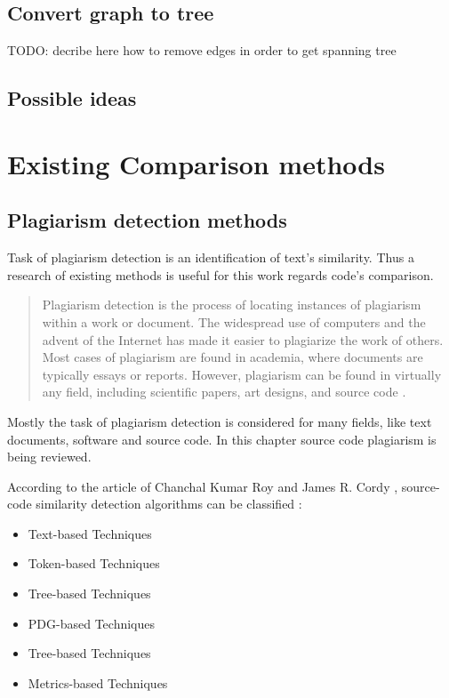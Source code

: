 \documentclass{report}
\begin{document}
\section{Convert graph to tree}

TODO: decribe here how to remove edges in order to get spanning tree

\section{Possible ideas}


\chapter{Existing Comparison methods}
\section{Plagiarism detection methods}

Task of plagiarism detection is an identification of text's similarity. Thus a research of existing methods is useful for this work regards code's comparison.
\begin{quote} Plagiarism detection is the process of locating instances of plagiarism within a work or document. The widespread use of computers and the advent of the Internet has made it easier to plagiarize the work of others. Most cases of plagiarism are found in academia, where documents are typically essays or reports. However, plagiarism can be found in virtually any field, including scientific papers, art designs, and source code \cite{wiki_plagiarism}. \end{quote}

Mostly the task of plagiarism detection is considered for many fields, like text documents, software and source code. In this chapter source code plagiarism is being reviewed.

According to the article of Chanchal Kumar Roy and James R. Cordy \cite{software_clone_detection}, source-code similarity detection 
algorithms can be classified :
\begin{itemize}
	\item Text-based Techniques
	\item Token-based Techniques
	\item Tree-based Techniques
	\item PDG-based Techniques
	\item Tree-based Techniques
	\item Metrics-based Techniques
\end{itemize}
\end{document}

